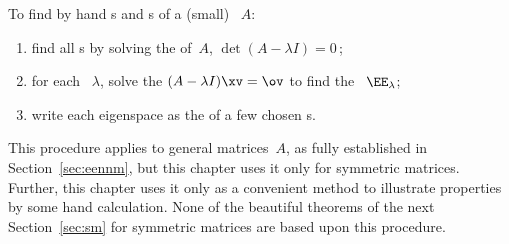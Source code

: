 \begin{procedure} \label{pro:eeh}
To find by hand s and s of a (small) ~\(A\):
\begin{enumerate}
\item find all s by solving the  of~\(A\), \(\det(A-\lambda I)=0\)\,;
\item for each ~\(\lambda\), solve the  \((A-\lambda I)\xv=\ov\) to find the ~\(\EE_\lambda\);
\item write each eigenspace as the  of a few chosen s.
\end{enumerate}
\end{procedure}

This procedure applies to general matrices~\(A\), as fully established in Section~\ref{sec:eennm}, but this chapter uses it only for symmetric matrices.
Further, this chapter uses it only as a convenient method to illustrate properties by some hand calculation.
None of the beautiful theorems of the next Section~\ref{sec:sm} for symmetric matrices are based upon this procedure.


